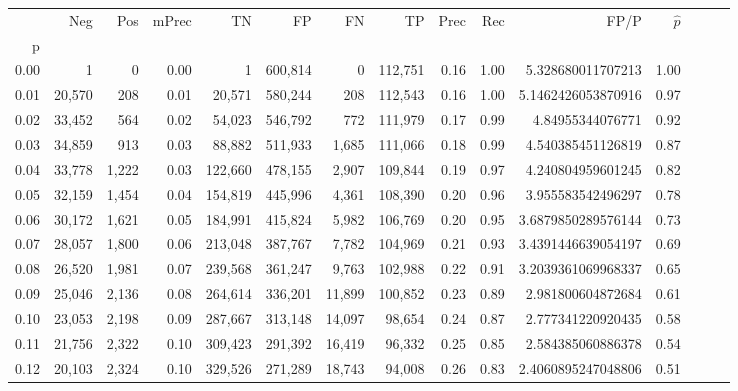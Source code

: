 \begin{tabular}{rrrrrrrrrrrrrrr}
\toprule
{} &     Neg &    Pos & mPrec &       TN &       FP &       FN &       TP &  Prec &   Rec &                    FP/P & $\hat{p}$ \\
p    &         &        &       &          &          &          &          &       &       &                         &           \\
\midrule
0.00 &       1 &      0 &  0.00 &        1 &  600,814 &        0 &  112,751 &  0.16 &  1.00 &       5.328680011707213 &      1.00 \\
0.01 &  20,570 &    208 &  0.01 &   20,571 &  580,244 &      208 &  112,543 &  0.16 &  1.00 &      5.1462426053870916 &      0.97 \\
0.02 &  33,452 &    564 &  0.02 &   54,023 &  546,792 &      772 &  111,979 &  0.17 &  0.99 &        4.84955344076771 &      0.92 \\
0.03 &  34,859 &    913 &  0.03 &   88,882 &  511,933 &    1,685 &  111,066 &  0.18 &  0.99 &       4.540385451126819 &      0.87 \\
0.04 &  33,778 &  1,222 &  0.03 &  122,660 &  478,155 &    2,907 &  109,844 &  0.19 &  0.97 &       4.240804959601245 &      0.82 \\
0.05 &  32,159 &  1,454 &  0.04 &  154,819 &  445,996 &    4,361 &  108,390 &  0.20 &  0.96 &       3.955583542496297 &      0.78 \\
0.06 &  30,172 &  1,621 &  0.05 &  184,991 &  415,824 &    5,982 &  106,769 &  0.20 &  0.95 &      3.6879850289576144 &      0.73 \\
0.07 &  28,057 &  1,800 &  0.06 &  213,048 &  387,767 &    7,782 &  104,969 &  0.21 &  0.93 &      3.4391446639054197 &      0.69 \\
0.08 &  26,520 &  1,981 &  0.07 &  239,568 &  361,247 &    9,763 &  102,988 &  0.22 &  0.91 &      3.2039361069968337 &      0.65 \\
0.09 &  25,046 &  2,136 &  0.08 &  264,614 &  336,201 &   11,899 &  100,852 &  0.23 &  0.89 &       2.981800604872684 &      0.61 \\
0.10 &  23,053 &  2,198 &  0.09 &  287,667 &  313,148 &   14,097 &   98,654 &  0.24 &  0.87 &       2.777341220920435 &      0.58 \\
0.11 &  21,756 &  2,322 &  0.10 &  309,423 &  291,392 &   16,419 &   96,332 &  0.25 &  0.85 &       2.584385060886378 &      0.54 \\
0.12 &  20,103 &  2,324 &  0.10 &  329,526 &  271,289 &   18,743 &   94,008 &  0.26 &  0.83 &      2.4060895247048806 &      0.51 \\

\end{tabular}
